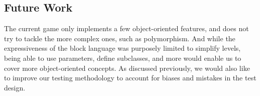 \documentclass[12pt,notitlepage]{article}
\begin{document}
\subsection{Future Work}

The current game only implements a few object-oriented features, and
does not try to tackle the more complex ones, such as
polymorphism. And while the expressiveness of the block language was
purposely limited to simplify levels, being able to use parameters,
define subclasses, and more would enable us to cover more
object-oriented concepts. As discussed previously, we would also like
to improve our testing methodology to account for biases and mistakes
in the test design.
\end{document}
